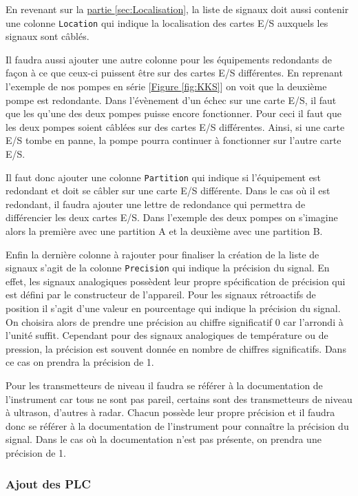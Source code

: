 \documentclass[11pt, openright]{book}
\begin{document}
En revenant sur la \hyperref[sec:Localisation]{partie \ref{sec:Localisation}}, la liste de signaux doit aussi contenir une colonne \texttt{Location} qui indique la localisation des cartes E/S auxquels les signaux sont câblés.

Il faudra aussi ajouter une autre colonne pour les équipements redondants de façon à ce que ceux-ci puissent être sur des cartes E/S différentes. En reprenant l'exemple de nos pompes en série [\hyperref[fig:KKS]{Figure \ref{fig:KKS}}] on voit que la deuxième pompe est redondante. Dans l'évènement d'un échec sur une carte E/S, il faut que les qu'une des deux pompes puisse encore fonctionner. Pour ceci il faut que les deux pompes soient câblées sur des cartes E/S différentes. Ainsi, si une carte E/S tombe en panne, la pompe pourra continuer à fonctionner sur l'autre carte E/S.

Il faut donc ajouter une colonne \texttt{Partition} qui indique si l'équipement est redondant et doit se câbler sur une carte E/S différente. Dans le cas où il est redondant, il faudra ajouter une lettre de redondance qui permettra de différencier les deux cartes E/S. Dans l'exemple des deux pompes on s'imagine alors la première avec une partition A et la deuxième avec une partition B.

Enfin la dernière colonne à rajouter pour finaliser la création de la liste de signaux s'agit de la colonne \texttt{Precision} qui indique la précision du signal. En effet, les signaux analogiques possèdent leur propre spécification de précision qui est défini par le constructeur de l'appareil. Pour les signaux rétroactifs de position il s'agit d'une valeur en pourcentage qui indique la précision du signal. On choisira alors de prendre une précision au chiffre significatif 0 car l'arrondi à l'unité suffit. Cependant pour des signaux analogiques de température ou de pression, la précision est souvent donnée en nombre de chiffres significatifs. Dans ce cas on prendra la précision de 1.

Pour les transmetteurs de niveau il faudra se référer à la documentation de l'instrument car tous ne sont pas pareil, certains sont des transmetteurs de niveau à ultrason, d'autres à radar. Chacun possède leur propre précision et il faudra donc se référer à la documentation de l'instrument pour connaître la précision du signal. Dans le cas où la documentation n'est pas présente, on prendra une précision de 1.

\subsubsection{Ajout des PLC}
\end{document}
